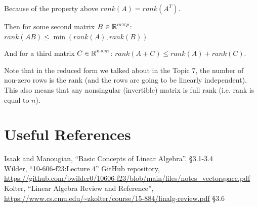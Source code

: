 Because of the property above $rank(A) = rank(A^T)$. 

Then for some second matrix $B\in\operatorname{\mathbb{R}}^{m\times p}$: $rank(AB) \le \min(rank(A),rank(B))$. 

And for a third matrix $C\in\operatorname{\mathbb{R}}^{n\times m}$: $rank(A + C) \le rank(A) + rank(C).$

Note that in the reduced form we talked about in the Topic 7, the number of non-zero rows is the rank (and the rows are going to be linearly independent). 
This also means that any nonsingular (invertible) matrix is full rank (i.e. rank is equal to $n$). 

\section*{Useful References}
Isaak and Manougian, ``Basic Concepts of Linear Algebra''. \S 3.1-3.4\\
Wilder, ``10-606-f23:Lecture 4'' GitHub repository, \url{https://github.com/bwilder0/10606-f23/blob/main/files/notes_vectorspace.pdf}\\
Kolter, ``Linear Algebra Review and Reference'', \url{https://www.cs.cmu.edu/~zkolter/course/15-884/linalg-review.pdf} \S3.6


